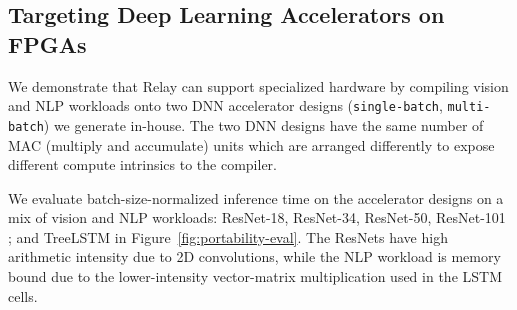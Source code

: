 \subsection{Targeting Deep Learning Accelerators on FPGAs}
We demonstrate that Relay can support specialized hardware by compiling vision and
NLP workloads onto two DNN accelerator designs (\texttt{single-batch}, \texttt{multi-batch}) we generate in-house.
%
%
%
The two DNN designs have the same number of MAC (multiply and accumulate) units which are
arranged differently to expose different compute intrinsics to the compiler.
%
%

We evaluate batch-size-normalized inference time on the accelerator designs
  on a mix of vision and NLP workloads:
  ResNet-18, ResNet-34, ResNet-50, ResNet-101 \citep{resnet};
  and TreeLSTM in Figure~\ref{fig:portability-eval}.
The ResNets have high arithmetic intensity
due to 2D convolutions, while the NLP workload is memory bound due to the lower-intensity vector-matrix
multiplication used in the LSTM cells.

